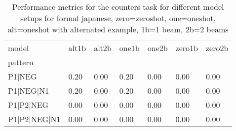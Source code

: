 \begin{table}[h]
\begin{tabular}{l|llllll}
\toprule
model & alt1b & alt2b & one1b & one2b & zero1b & zero2b \\
pattern &  &  &  &  &  &  \\
\midrule
P1|NEG & 0.20 & 0.00 & 0.20 & 0.00 & 0.00 & 0.00 \\
P1|NEG|N1 & 0.20 & 0.00 & 0.20 & 0.00 & 0.00 & 0.00 \\
P1|P2|NEG & 0.00 & 0.00 & 0.00 & 0.00 & 0.00 & 0.00 \\
P1|P2|NEG|N1 & 0.00 & 0.00 & 0.00 & 0.00 & 0.00 & 0.00 \\
\bottomrule
\end{tabular}
\caption{Performance metrics for the counters task for different model setups for formal japanese, zero=zeroshot, one=oneshot, alt=oneshot with alternated example, 1b=1 beam, 2b=2 beams}
\label{tab:ja form_counters_performance}
\end{table}
